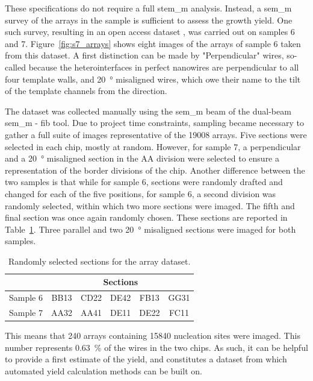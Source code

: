 These specifications do not require a full \acs{stem_m} analysis. Instead, a \acs{sem_m} survey of the arrays in the sample is sufficient to assess the growth yield. One such survey, resulting in an open access dataset \cite{dataset}, was carried out on samples 6 and 7. Figure~\ref{fig:s7_arrays} shows eight images of the arrays of sample 6 taken from this dataset. A first distinction can be made by "Perpendicular" wires, so-called because the heterointerfaces in perfect nanowires are perpendicular to all four template walls, and \qty{20}{\degree} misaligned wires, which owe their name to the tilt of the template channels from the  direction.

The dataset was collected manually using the \acs{sem_m} beam of the dual-beam \acs{sem_m} - \acs{fib} tool. Due to project time constraints, sampling became necessary to gather a full suite of images representative of the \num{19008} arrays. Five sections were selected in each chip, mostly at random. However, for sample 7, a perpendicular and a \qty{20}{\degree} misaligned section in the AA division were selected to ensure a representation of the border divisions of the chip. Another difference between the two samples is that while for sample 6, sections were randomly drafted and changed for each of the five positions, for sample 6, a second division was randomly selected, within which two more sections were imaged. The fifth and final section was once again randomly chosen. These sections are reported in Table~\ref{tab:dataset_sections}. Three parallel and two \qty{20}{\degree} misaligned sections were imaged for both samples.

\begin{table}
    \centering
    \caption{Randomly selected sections for the array dataset.}
    \begin{tabular}{c|c c c c c}
         & \multicolumn{5}{c}{Sections} \\ \hline
        Sample 6 & BB13 & CD22 & DE42 & FB13 & GG31 \\
        Sample 7 & AA32 & AA41 & DE11 & DE22 & FC11 \\ \hline \hline
    \end{tabular}
    \label{tab:dataset_sections}
\end{table}

This means that 240 arrays containing 15840 nucleation sites were imaged. This number represents \qty{0.63}{\percent} of the wires in the two chips. As such, it can be helpful to provide a first estimate of the yield, and constitutes a dataset from which automated yield calculation methods can be built on.

